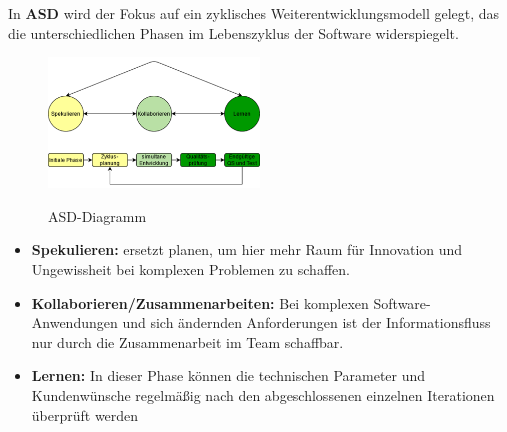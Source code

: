In \textbf{ASD} wird der Fokus auf ein zyklisches Weiterentwicklungsmodell gelegt, das die unterschiedlichen Phasen im Lebenszyklus
der Software widerspiegelt. \cite{Abdelaziz2015-lb}
\begin{figure}[h!]
\centering
\caption{ASD-Diagramm}
    \includegraphics[width=0.5\textwidth]{fig/ASD.png}
    \label{fig:ASD-diagram}
\end{figure}
\begin{itemize}
    \item \textbf{Spekulieren:} ersetzt planen, um hier mehr Raum für Innovation und Ungewissheit bei komplexen Problemen zu schaffen.
    \item \textbf{Kollaborieren/Zusammenarbeiten:} Bei komplexen Software-Anwendungen und sich ändernden Anforderungen ist der Informationsfluss nur durch die Zusammenarbeit im Team schaffbar.
    \item \textbf{Lernen:} In dieser Phase können die technischen Parameter und Kundenwünsche regelmäßig nach den abgeschlossenen einzelnen Iterationen überprüft werden
\end{itemize}
\cite{Alnoukari2008-ro,Abdelaziz2015-lb} \\


